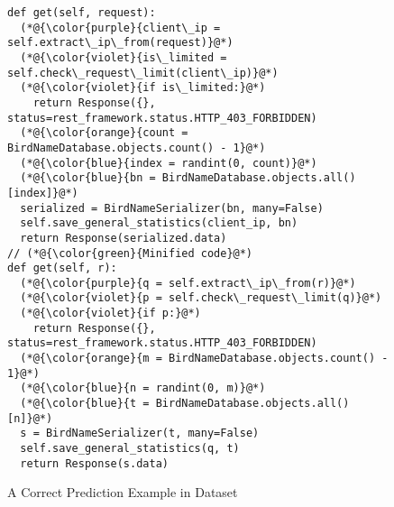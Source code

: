 \begin{figure}[t]
	\centering {} \begin{lstlisting}[]
def get(self, request):
  (*@{\color{purple}{client\_ip = self.extract\_ip\_from(request)}@*)
  (*@{\color{violet}{is\_limited = self.check\_request\_limit(client\_ip)}@*)
  (*@{\color{violet}{if is\_limited:}@*)
    return Response({}, status=rest_framework.status.HTTP_403_FORBIDDEN)
  (*@{\color{orange}{count = BirdNameDatabase.objects.count() - 1}@*)
  (*@{\color{blue}{index = randint(0, count)}@*)
  (*@{\color{blue}{bn = BirdNameDatabase.objects.all()[index]}@*)
  serialized = BirdNameSerializer(bn, many=False)
  self.save_general_statistics(client_ip, bn)
  return Response(serialized.data)
// (*@{\color{green}{Minified code}@*)
def get(self, r):
  (*@{\color{purple}{q = self.extract\_ip\_from(r)}@*)
  (*@{\color{violet}{p = self.check\_request\_limit(q)}@*)
  (*@{\color{violet}{if p:}@*)
    return Response({}, status=rest_framework.status.HTTP_403_FORBIDDEN)
  (*@{\color{orange}{m = BirdNameDatabase.objects.count() - 1}@*)
  (*@{\color{blue}{n = randint(0, m)}@*)
  (*@{\color{blue}{t = BirdNameDatabase.objects.all()[n]}@*)
  s = BirdNameSerializer(t, many=False)
  self.save_general_statistics(q, t)
  return Response(s.data)       
\end{lstlisting}
\vspace{-18pt}
\caption{A Correct Prediction Example in Dataset}
\vspace{-4pt}
\label{example1}
\end{figure}


